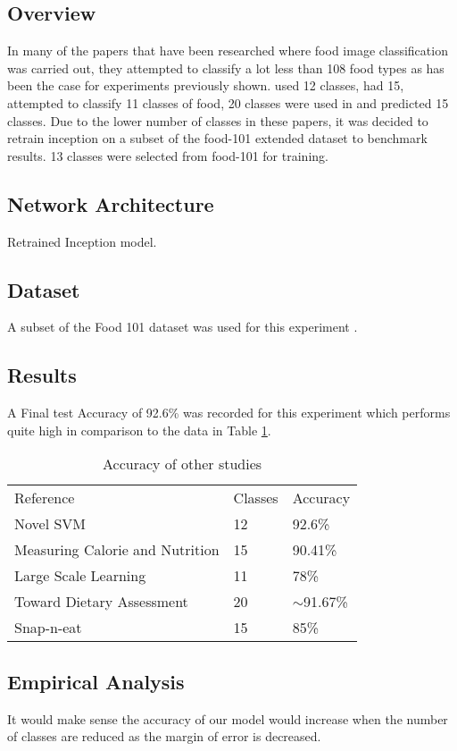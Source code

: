 \subsection*{Overview}
In many of the papers that have been researched where food image classification was carried out, they attempted to classify a lot less than 108 food types as has been the case for experiments previously shown.
\textcite{novelSVM} used 12 classes, \textcite{pouladzadeh2014measuring} had 15, \textcite{LSL_2015} attempted to classify 11 classes of food, 20 classes were used in \textcite{chen2010toward} and \textcite{snap} predicted 15 classes.
Due to the lower number of classes in these papers, it was decided to retrain inception on a subset of the food-101 extended dataset to benchmark results.
13 classes were selected from food-101 for training.

\subsection*{Network Architecture}
Retrained Inception model.

\subsection*{Dataset}
A subset of the Food 101 dataset was used for this experiment \textcite{food101}.

\subsection*{Results}
A Final test Accuracy of 92.6\% was recorded for this experiment which performs quite high in comparison to the data in Table \ref{classes_accuracy}.

\begin{table}[]
\centering
\caption{Accuracy of other studies}
\label{classes_accuracy}
\begin{tabular}{lll}
Reference                       & Classes & Accuracy      \\
Novel SVM                       & 12      & 92.6\%        \\
Measuring Calorie and Nutrition & 15      & 90.41\%       \\
Large Scale Learning            & 11      & 78\%          \\
Toward Dietary Assessment       & 20      & $\sim$91.67\% \\
Snap-n-eat                      & 15      & 85\%         
\end{tabular}
\end{table}

\subsection*{Empirical Analysis}
It would make sense the accuracy of our model would increase when the number of classes are reduced as the margin of error is decreased.